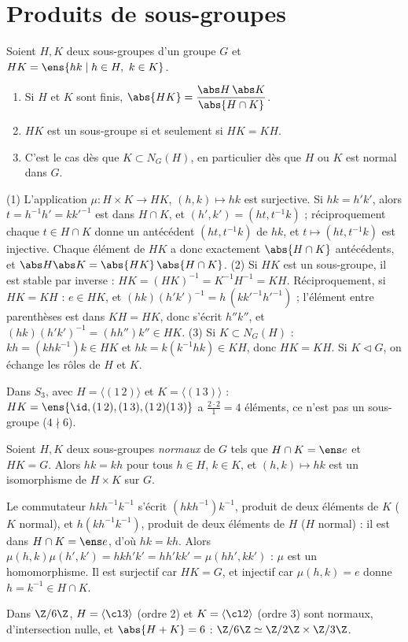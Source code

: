 \section{Produits de sous-groupes}
\begin{proposition}[Le produit $HK$]\label{prop-hk}
Soient $H,K$ deux sous-groupes d'un groupe $G$ et $HK=\ens{hk\mid h\in H,\ k\in K}$.
\begin{enumerate}
\item Si $H$ et $K$ sont finis, $\abs{HK}=\dfrac{\abs H\,\abs K}{\abs{H\cap K}}$.
\item $HK$ est un sous-groupe si et seulement si $HK=KH$.
\item C'est le cas dès que $K\subset N_G(H)$, en particulier dès que $H$ ou $K$ est normal dans $G$.
\end{enumerate}
\end{proposition}
\begin{preuve}
(1) L'application $\mu:H\times K\to HK$, $(h,k)\mapsto hk$ est surjective. Si $hk=h'k'$, alors $t=h^{-1}h'=kk'^{-1}$ est dans $H\cap K$, et $(h',k')=(ht,t^{-1}k)$ ; réciproquement chaque $t\in H\cap K$ donne un antécédent $(ht,t^{-1}k)$ de $hk$, et $t\mapsto(ht,t^{-1}k)$ est injective. Chaque élément de $HK$ a donc exactement $\abs{H\cap K}$ antécédents, et $\abs H\abs K=\abs{HK}\,\abs{H\cap K}$.
(2) Si $HK$ est un sous-groupe, il est stable par inverse : $HK=(HK)^{-1}=K^{-1}H^{-1}=KH$. Réciproquement, si $HK=KH$ : $e\in HK$, et $(hk)(h'k')^{-1}=h\,(kk'^{-1}h'^{-1})$ ; l'élément entre parenthèses est dans $KH=HK$, donc s'écrit $h''k''$, et $(hk)(h'k')^{-1}=(hh'')k''\in HK$.
(3) Si $K\subset N_G(H)$ : $kh=(khk^{-1})k\in HK$ et $hk=k(k^{-1}hk)\in KH$, donc $HK=KH$. Si $K\lhd G$, on échange les rôles de $H$ et $K$.
\end{preuve}
\begin{exemple}
Dans $S_3$, avec $H=\langle(1\,2)\rangle$ et $K=\langle(1\,3)\rangle$ : $HK=\ens{\id,(1\,2),(1\,3),(1\,2)(1\,3)}$ a $\frac{2\cdot2}1=4$ éléments, ce n'est pas un sous-groupe ($4\nmid6$).
\end{exemple}
\begin{theoreme}\label{thm-produit-direct}
Soient $H,K$ deux sous-groupes \emph{normaux} de $G$ tels que $H\cap K=\ens e$ et $HK=G$. Alors $hk=kh$ pour tous $h\in H$, $k\in K$, et $(h,k)\mapsto hk$ est un isomorphisme de $H\times K$ sur $G$.
\end{theoreme}
\begin{preuve}
Le commutateur $hkh^{-1}k^{-1}$ s'écrit $(hkh^{-1})k^{-1}$, produit de deux éléments de $K$ ($K$ normal), et $h(kh^{-1}k^{-1})$, produit de deux éléments de $H$ ($H$ normal) : il est dans $H\cap K=\ens e$, d'où $hk=kh$. Alors $\mu(h,k)\mu(h',k')=hkh'k'=hh'kk'=\mu(hh',kk')$ : $\mu$ est un homomorphisme. Il est surjectif car $HK=G$, et injectif car $\mu(h,k)=e$ donne $h=k^{-1}\in H\cap K$.
\end{preuve}
\begin{exemple}
Dans $\Z/6\Z$, $H=\langle\cl3\rangle$ (ordre 2) et $K=\langle\cl2\rangle$ (ordre 3) sont normaux, d'intersection nulle, et $\abs{H+K}=6$ : $\Z/6\Z\simeq\Z/2\Z\times\Z/3\Z$.
\end{exemple}

